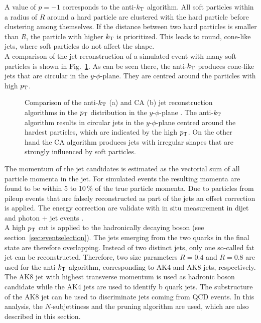\noindent A value of $p=-1$ corresponds to the anti-$k_{\rm T}$ algorithm. All soft particles within a radius of $R$ around a hard particle are clustered with the hard particle before clustering among themselves. If the distance between two hard particles is smaller than $R$, the particle with higher $k_{\rm T}$ is prioritized. This leads to round, cone-like jets, where soft particles do not affect the shape.\\

\noindent A comparison of the jet reconstruction of a simulated event with many soft particles is shown in Fig.~\ref{fig:eventreco:jet_reco}. As can be seen there, the anti-$k_{\rm T}$ produces cone-like jets that are circular in the $y$-$\phi$-plane. They are centred around the particles with high $p_{\rm T}$.\\
\begin{figure}
	\centering
	\caption[Comparison of the anti-$k_{\rm T}$ and CA jet reconstruction algorithms]{Comparison of the anti-$k_{\rm T}$ (a) and CA (b) jet reconstruction algorithms in the $p_{\rm T}$ distribution in the $y$-$\phi$-plane \cite{antikt}. The anti-$k_{\rm T}$ algorithm results in circular jets in the $y$-$\phi$-plane centred around the hardest particles, which are indicated by the high $p_{\rm T}$. On the other hand the CA algorithm produces jets with irregular shapes that are strongly influenced by soft particles.}
	\label{fig:eventreco:jet_reco}
\end{figure}

\noindent The momentum of the jet candidates is estimated as the vectorial sum of all particle momenta in the jet. For simulated events the resulting momenta are found to be within 5 to 10\,\% of the true particle momenta. Due to particles from pileup events that are falsely reconstructed as part of the jets an offset correction is applied. The energy correction are validate with in situ measurement in dijet and photon + jet events \cite{jetcorrection}.\\

\noindent A high $p_{\rm T}$ cut is applied to the hadronically decaying boson (see section~\ref{sec:eventselection}). The jets emerging from the two quarks in the final state are therefore overlapping. Instead of two distinct jets, only one so-called fat jet can be reconstructed. Therefore, two size parameters $R=0.4$ and $R=0.8$ are used for the anti-$k_{\rm T}$ algorithm, corresponding to AK4 and AK8 jets, respectively. The AK8 jet with highest transverse momentum is used as hadronic boson candidate while the AK4 jets are used to identify b quark jets. The substructure of the AK8 jet can be used to discriminate jets coming from QCD events. In this analysis, the $N$-subjettiness and the pruning algorithm are used, which are also described in this section.

